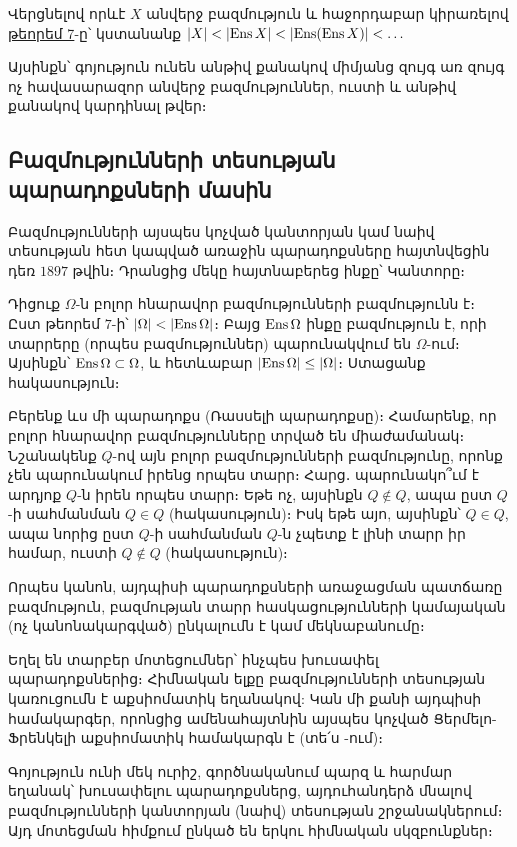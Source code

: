 \documentclass[./main.tex]{subfiles}
\begin{document}
\begin{hetevanq7}\label{ch3cor4}
Վերցնելով որևէ $X$ անվերջ բազմություն և հաջոր\-դա\-բար կիրառե\-լով \hyperref[թեորեմ 7]{թեորեմ 7}-ը՝ կստանանք $\lvert X\rvert<\lvert\operatorname{Ens} X\rvert<\lvert\operatorname{Ens} (\operatorname{Ens} X)\rvert<\dots$
\par Այսինքն՝ գոյություն ունեն անթիվ քանակով միմյանց զույգ առ զույգ ոչ հավա\-սա\-րա\-զոր անվերջ բազմություններ, ուստի և անթիվ քանակով կարդինալ թվեր։
\end{hetevanq7}
\subsection*{Բազմությունների տեսության պարադոքսների մասին}
Բազմությունների այսպես կոչված կանտորյան կամ նաիվ տեսության հետ կապ\-ված առաջին պարադոքսները հայտնվեցին դեռ $1897$ թվին։ Դրանցից մեկը հայտ\-նա\-բերեց ինքը՝ Կանտորը։
\par Դիցուք $\Omega$-ն բոլոր հնա\-րա\-վոր բազմությունների բազմությունն է։ Ըստ թեորեմ ${ 7 \textrm{-ի} }$՝ $\lvert\Omega\rvert<\lvert\operatorname{Ens} \Omega\rvert$։ Բայց $\operatorname{Ens} \Omega$ ինքը բազմություն է, որի տարրերը (որպես բազմութ\-յուն\-ներ) պարունակվում են $\Omega$-ում։ Այսինքն՝ $\operatorname{Ens} \Omega \subset \Omega$, և հետևաբար $\lvert\operatorname{Ens} \Omega\rvert\leq \lvert\Omega\rvert$։ Ստացանք հակասություն։
\par Բերենք ևս մի պարադոքս (Ռասսելի պարադոքսը)։ Համարենք, որ բոլոր հնա\-րա\-վոր բազմությունները տրված են միաժամանակ։ Նշանակենք $Q$-ով  այն բոլոր բազմութ\-յուն\-ների բազմությունը, որոնք չեն պարունակում իրենց որպես տարր։ \linebreak  Հարց․ պարու\-նա\-կո՞ւմ է արդյոք $Q$-ն իրեն որպես տարր։ Եթե ոչ, այսինքն $Q \not\in Q$, ապա ըստ $Q$-ի սահմանման $Q\in Q$ (հակասություն)։ Իսկ եթե այո, այսինքն՝ $Q\in Q$, ապա նորից ըստ $Q$-ի սահմանման $Q$-ն չպետք է լինի տարր իր համար, ուստի $Q\not\in Q$ (հակասություն)։
\par Որպես կանոն, այդպիսի պարադոքսների առաջացման պատճառը բազմություն, բազմության տարր հասկացությունների կամայական (ոչ կանոնակարգված) ընկա\-լումն է կամ մեկնաբանումը։
\par Եղել են տարբեր մոտեցումներ՝ ինչպես խուսափել պարադոքսներից։ Հիմնական ելքը բազմությունների տեսության կառուցումն է աքսիոմատիկ եղանակով: Կան մի քանի այդպիսի համակարգեր, որոնցից ամենահայտնին այսպես կոչված Ցերմելո-Ֆրենկելի աքսիոմատիկ համակարգն է (տե՛ս \cite{Frenkel}-ում)։
\par Գոյություն ունի մեկ ուրիշ, գործնականում պարզ և հարմար եղանակ՝ խուսա\-փե\-լու պարադոքսներց, այդուհանդերձ մնալով բազմությունների կանտորյան (նաիվ) տեսության շրջանակներում։ Այդ մոտեցման հիմքում ընկած են երկու հիմնական սկզբունքներ։
\end{document}
